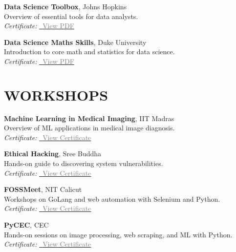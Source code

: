 \documentclass[11pt,a4paper]{article}
\begin{document}
\textbf{Data Science Toolbox}, Johns Hopkins \\
Overview of essential tools for data analysts. \\
\textit{Certificate:} \href{https://coursera.org/share/bd0023b71386ae9c7246bad3d5b566a7}{\faFilePdfO~\textcolor{gray}{View PDF}}

\textbf{Data Science Maths Skills}, Duke University \\
Introduction to core math and statistics for data science. \\
\textit{Certificate:} \href{https://coursera.org/share/4bcf67532cd1ae69781e51db0bbb3445}{\faFilePdfO~\textcolor{gray}{View PDF}}

\section*{WORKSHOPS}
\textbf{Machine Learning in Medical Imaging}, IIT Madras \\
Overview of ML applications in medical image diagnosis. \\
\textit{Certificate:} \href{/certificates/mlmedic.jpg}{\faFilePdfO~\textcolor{gray}{View Certificate}}

\textbf{Ethical Hacking}, Sree Buddha \\
Hands-on guide to discovering system vulnerabilities. \\
\textit{Certificate:} \href{/certificates/ethical_hacking.jpg}{\faFilePdfO~\textcolor{gray}{View Certificate}}

\textbf{FOSSMeet}, NIT Calicut \\
Workshops on GoLang and web automation with Selenium and Python. \\
\textit{Certificate:} \href{/certificates/fossmeet.jpg}{\faFilePdfO~\textcolor{gray}{View Certificate}}

\textbf{PyCEC}, CEC \\
Hands-on sessions on image processing, web scraping, and ML with Python. \\
\textit{Certificate:} \href{/certificates/pycec.jpg}{\faFilePdfO~\textcolor{gray}{View Certificate}}
\end{document}
